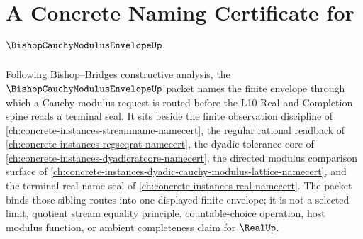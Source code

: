 \chapter{A Concrete Naming Certificate for $\BishopCauchyModulusEnvelopeUp$}
\label{ch:concrete-instances-bishop-cauchy-modulus-envelope-namecert}

Following Bishop--Bridges constructive analysis, the $\BishopCauchyModulusEnvelopeUp$ packet names the finite envelope through which a Cauchy-modulus request is routed before the L10 Real and Completion spine reads a terminal seal. It sits beside the finite observation discipline of \autoref{ch:concrete-instances-streamname-namecert}, the regular rational readback of \autoref{ch:concrete-instances-regseqrat-namecert}, the dyadic tolerance core of \autoref{ch:concrete-instances-dyadicratcore-namecert}, the directed modulus comparison surface of \autoref{ch:concrete-instances-dyadic-cauchy-modulus-lattice-namecert}, and the terminal real-name seal of \autoref{ch:concrete-instances-real-namecert}. The packet binds those sibling routes into one displayed finite envelope; it is not a selected limit, quotient stream equality principle, countable-choice operation, host modulus function, or ambient completeness claim for $\RealUp$.

